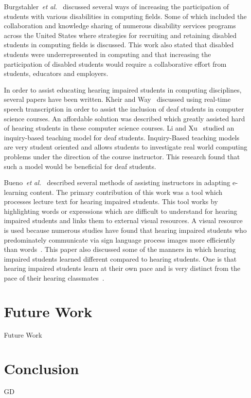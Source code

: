 \documentclass{acm_proc_article-sp}
\begin{document}
Burgstahler~\emph{et al.}~\cite{4418169} discussed several ways of increasing the participation of students with various disabilities in computing fields. Some of which included the collaboration and knowledge sharing of numerous disability services programs across the United States where strategies for recruiting and retaining disabled students in computing fields is discussed. This work also stated that disabled students were underrepresented in computing and that increasing the participation of disabled students would require a collaborative effort from students, educators and employers.

In order to assist educating hearing impaired students in computing disciplines, several papers have been written. Kheir and Way~\cite{Kheir:2007:IDS:1269900.1268860} discussed using real-time speech transcription in order to assist the inclusion of deaf students in computer science courses. An affordable solution was described which greatly assisted hard of hearing students in these computer science courses. Li and Xu~\cite{5454732} studied an inquiry-based teaching model for deaf students. Inquiry-Based teaching models are very student oriented and allows students to investigate real world computing problems under the direction of the course instructor. This research found that such a model would be beneficial for deaf students.

Bueno~\emph{et al.}~\cite{Bueno:2007:ALA:1268784.1268903} described several methods of assisting instructors in adapting e-learning content. The primary contribution of this work was a tool which processes lecture text for hearing impaired students. This tool works by highlighting words or expressions which are difficult to understand for hearing impaired students and links them to external visual resources. A visual resource is used because numerous studies have found that hearing impaired students who predominately communicate via sign language process images more efficiently than words~\cite{Santos}. This paper also discussed some of the manners in which hearing impaired students learned different compared to hearing students. One is that hearing impaired students learn at their own pace and is very distinct from the pace of their hearing classmates~\cite{Bueno:2007:ECA:1268784.1268862}. 


\section{Future Work}
\label{sec: futurework}
Future Work


\section{Conclusion}
\label{sec: conclusion}

GD






  


\end{document}
